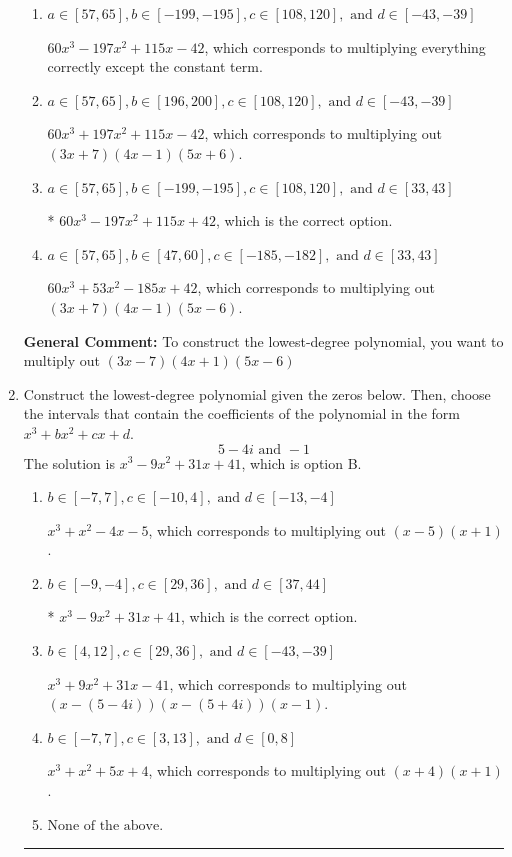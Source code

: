 \documentclass{extbook}[14pt]
\newcommand{\litem}[1]{\item #1

\rule{\textwidth}{0.4pt}}
\begin{document}
\begin{enumerate}
{\begin{enumerate}[label=\Alph*.]
$60x^{3} +83 x^{2} -151 x -42$, which corresponds to multiplying out $(3x + 7)(4x + 1)(5x -6)$.
\item \( a \in [57, 65], b \in [-199, -195], c \in [108, 120], \text{ and } d \in [-43, -39] \)

$60x^{3} -197 x^{2} +115 x -42$, which corresponds to multiplying everything correctly except the constant term.
\item \( a \in [57, 65], b \in [196, 200], c \in [108, 120], \text{ and } d \in [-43, -39] \)

$60x^{3} +197 x^{2} +115 x -42$, which corresponds to multiplying out $(3x + 7)(4x -1)(5x + 6)$.
\item \( a \in [57, 65], b \in [-199, -195], c \in [108, 120], \text{ and } d \in [33, 43] \)

* $60x^{3} -197 x^{2} +115 x + 42$, which is the correct option.
\item \( a \in [57, 65], b \in [47, 60], c \in [-185, -182], \text{ and } d \in [33, 43] \)

$60x^{3} +53 x^{2} -185 x + 42$, which corresponds to multiplying out $(3x + 7)(4x -1)(5x -6)$.
\end{enumerate}

\textbf{General Comment:} To construct the lowest-degree polynomial, you want to multiply out $(3x -7)(4x + 1)(5x -6)$
}
\litem{
Construct the lowest-degree polynomial given the zeros below. Then, choose the intervals that contain the coefficients of the polynomial in the form $x^3+bx^2+cx+d$.
\[ 5 - 4 i \text{ and } -1 \]The solution is \( x^{3} -9 x^{2} +31 x + 41 \), which is option B.\begin{enumerate}[label=\Alph*.]
\item \( b \in [-7, 7], c \in [-10, 4], \text{ and } d \in [-13, -4] \)

$x^{3} + x^{2} -4 x -5$, which corresponds to multiplying out $(x -5)(x + 1)$.
\item \( b \in [-9, -4], c \in [29, 36], \text{ and } d \in [37, 44] \)

* $x^{3} -9 x^{2} +31 x + 41$, which is the correct option.
\item \( b \in [4, 12], c \in [29, 36], \text{ and } d \in [-43, -39] \)

$x^{3} +9 x^{2} +31 x -41$, which corresponds to multiplying out $(x-(5 - 4 i))(x-(5 + 4 i))(x -1)$.
\item \( b \in [-7, 7], c \in [3, 13], \text{ and } d \in [0, 8] \)

$x^{3} + x^{2} +5 x + 4$, which corresponds to multiplying out $(x + 4)(x + 1)$.
\item \( \text{None of the above.} \)


\end{enumerate}}
\end{enumerate}
\end{document}
